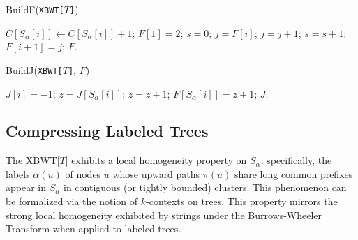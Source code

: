 \begin{algorithm}[H]
    \caption{BuildF(\texttt{XBWT[$T$]})}
    \label{alg:buildF}
    \begin{algorithmic}[1]
        \State $C[S_\alpha[i]] \gets C[S_\alpha[i]] + 1$; 
    \EndFor
    \State $F[1] = 2$; 
     
        \State $s = 0$; $j = F[i]$;
         
            \State $j = j + 1$;
             
                \State $s = s + 1$;
            \EndIf
        \EndWhile
        \State $F[i+1] = j$;
    \EndFor
    \State \Return $F$.
    \end{algorithmic}
\end{algorithm}
    
\begin{algorithm}[H]
    \caption{BuildJ(\texttt{XBWT[$T$]}, $F$)}
    \begin{algorithmic}[1]
            \State $J[i] = -1$; 
        \Else
            \State $z = J[S_\alpha[i]]$;
             
                \State $z = z + 1$;
            \EndWhile
            \State $F[S_\alpha[i]] = z + 1$;
        \EndIf
    \EndFor
    \State \Return $J$.
    \end{algorithmic}
\end{algorithm}

\subsection{Compressing Labeled Trees}

The XBWT[$T$] exhibits a local homogeneity property on $S_{\alpha}$: specifically, the labels $\alpha(u)$ of nodes $u$ whose upward paths $\pi(u)$ share long common prefixes appear in $S_{\alpha}$ in contiguous (or tightly bounded) clusters. This phenomenon can be formalized via the notion of $k$-contexts on trees.
This property mirrors the strong local homogeneity exhibited by strings under the Burrows-Wheeler Transform \cite{burrows1994block} when applied to labeled trees.

